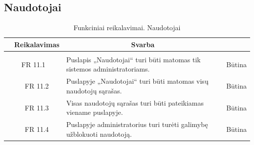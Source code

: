 \documentclass{VUMIFPSkursinis}
\begin{document}
\subsection{Naudotojai}
\begin{table}[H]
	\caption{Funkciniai reikalavimai. Naudotojai}
	\begin{tabular}{|p{1cm}|p{1cm}|p{}|p{}|}
		\hline 
		\rowcolor{gray!50}
		\multicolumn{2}{|c|}{{\bfseries Kodas}}&
		\multicolumn{1}{c|}{{\bfseries Reikalavimas}}&
		\multicolumn{1}{c|}{{\bfseries Svarba}}\\
		\hline
		\rowcolor{lightgray}
		\multicolumn{4}{|c|}{Naudotojai}\\				
		\hline
		\multicolumn{2}{|c|}{FR 11.1}&
		{Puslapis „Naudotojai“ turi būti matomas tik sistemos administratoriams.
		}&		
		\multicolumn{1}{c|}{Būtina}\\
		\hline
		\multicolumn{1}{|c}{}&
		\multicolumn{1}{c|}{FR 11.2}&
		{Puslapyje „Naudotojai“ turi būti matomas visų naudotojų sąrašas.
		}&		
		\multicolumn{1}{c|}{Būtina}\\
		\hline	
		\multicolumn{1}{|c}{}&
		\multicolumn{1}{c|}{FR 11.3}&
		{Visas naudotojų sąrašas turi būti pateikiamas viename puslapyje.
		}&
		\multicolumn{1}{c|}{Būtina}\\									
		\hline
		\multicolumn{1}{|c}{}&
		\multicolumn{1}{c|}{FR 11.4}&
		{Puslapyje administratorius turi turėti galimybę užblokuoti naudotoją.
		}&
		\multicolumn{1}{c|}{Būtina}\\									
		\hline
	\end{tabular}		
\end{table}
\end{document}
